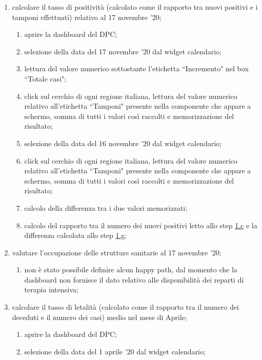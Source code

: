 \begin{enumerate}
    \item calcolare il tasso di positività (calcolato come il rapporto tra nuovi positivi e i tamponi effettuati) relativo al 17 novembre '20;    
    \begin{enumerate}[label=\alph*.]
        \item aprire la dashboard del DPC;
        \item selezione della data del 17 novembre '20 dal widget calendario;
        \item lettura del valore numerico sottostante l'etichetta ``Incremento" nel box ``Totale casi";\label{ta:c}
        \item click sul cerchio di ogni regione italiana, lettura del valore numerico relativo all'etichetta ``Tamponi" presente nella componente che appare a schermo, somma di tutti i valori così raccolti e memorizzazione del risultato;
        \item selezione della data del 16 novembre '20 dal widget calendario;
        \item click sul cerchio di ogni regione italiana, lettura del valore numerico relativo all'etichetta ``Tamponi" presente nella componente che appare a schermo, somma di tutti i valori così raccolti e memorizzazione del risultato;
        \item calcolo della differenza tra i due valori memorizzati;\label{ta:g}
        \item calcolo del rapporto tra il numero dei nuovi positivi letto allo step \hyperref[ta:c]{1.c} e la differenza calcolata allo step \hyperref[ta:g]{1.g};
    \end{enumerate}
    \item valutare l'occupazione delle strutture sanitarie al 17 novembre '20;
    \begin{enumerate}[label=\alph*.]
        \item non è stato possibile definire alcun happy path, dal momento che la dashboard non fornisce il dato relativo alle disponibilità dei reparti di terapia intensiva;
    \end{enumerate}
    \item calcolare il tasso di letalità (calcolato come il rapporto tra il numero dei deceduti e il numero dei casi) medio nel mese di Aprile;
    \begin{enumerate}[label=\alph*.]
        \item aprire la dashboard del DPC;
        \item selezione della data del 1 aprile '20 dal widget calendario;

\end{enumerate}
\end{enumerate}
